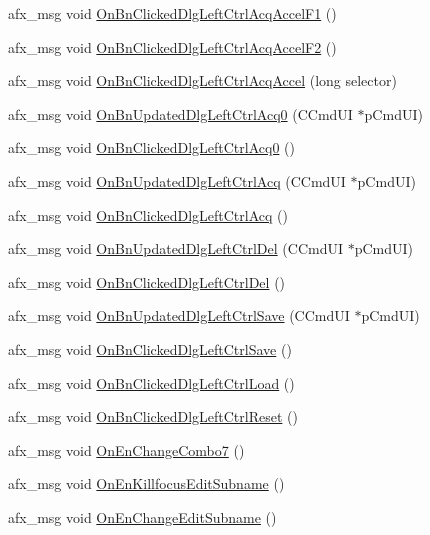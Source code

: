 \begin{DoxyCompactItemize}
afx\_\-msg void \hyperlink{classCDlgBarControl_a30dd6ac8cf15b751348f42dbd639504d}{OnBnClickedDlgLeftCtrlAcqAccelF1} ()
\item 
afx\_\-msg void \hyperlink{classCDlgBarControl_ad1f9a92b00205f636e6c93cd581cf135}{OnBnClickedDlgLeftCtrlAcqAccelF2} ()
\item 
afx\_\-msg void \hyperlink{classCDlgBarControl_aa5560e7efe635315057a94cc72193803}{OnBnClickedDlgLeftCtrlAcqAccel} (long selector)
\item 
afx\_\-msg void \hyperlink{classCDlgBarControl_a6aae901bf495849a352c13c03b770178}{OnBnUpdatedDlgLeftCtrlAcq0} (CCmdUI $\ast$pCmdUI)
\item 
afx\_\-msg void \hyperlink{classCDlgBarControl_a5fd4a5b84317b4da4a8f59b5bfb76637}{OnBnClickedDlgLeftCtrlAcq0} ()
\item 
afx\_\-msg void \hyperlink{classCDlgBarControl_a2863ee2022f915c508bff0d318adce7b}{OnBnUpdatedDlgLeftCtrlAcq} (CCmdUI $\ast$pCmdUI)
\item 
afx\_\-msg void \hyperlink{classCDlgBarControl_a8df4b53710729ca95899e55f6a17cc8c}{OnBnClickedDlgLeftCtrlAcq} ()
\item 
afx\_\-msg void \hyperlink{classCDlgBarControl_a5cd50f1105b3c39582610f59d1172ebc}{OnBnUpdatedDlgLeftCtrlDel} (CCmdUI $\ast$pCmdUI)
\item 
afx\_\-msg void \hyperlink{classCDlgBarControl_ab381f6f11ad8c3a8c0c33396c87f6060}{OnBnClickedDlgLeftCtrlDel} ()
\item 
afx\_\-msg void \hyperlink{classCDlgBarControl_a0e21d0f787d0f076b7227a0a1c7e9b04}{OnBnUpdatedDlgLeftCtrlSave} (CCmdUI $\ast$pCmdUI)
\item 
afx\_\-msg void \hyperlink{classCDlgBarControl_accfdebf73d6947ff135b04b07cb5b2d3}{OnBnClickedDlgLeftCtrlSave} ()
\item 
afx\_\-msg void \hyperlink{classCDlgBarControl_a37c25c7c04e9c3e9d1374b8556f6d7db}{OnBnClickedDlgLeftCtrlLoad} ()
\item 
afx\_\-msg void \hyperlink{classCDlgBarControl_a9348e047310e383a86476f8b78a60b8a}{OnBnClickedDlgLeftCtrlReset} ()
\item 
afx\_\-msg void \hyperlink{classCDlgBarControl_a70ef8952db5156f1d54a3b73cd9988b6}{OnEnChangeCombo7} ()
\item 
afx\_\-msg void \hyperlink{classCDlgBarControl_a6f1e8e44db4ecff3a39f07163dc4e962}{OnEnKillfocusEditSubname} ()
\item 
afx\_\-msg void \hyperlink{classCDlgBarControl_afe1b0f4165b34aa1a870f0e075f0acad}{OnEnChangeEditSubname} ()
\end{DoxyCompactItemize}
